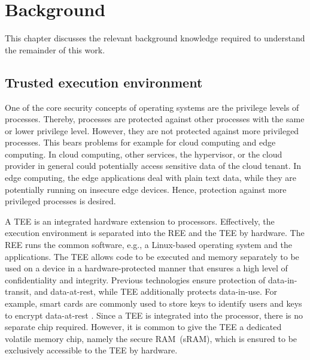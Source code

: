 
\chapter{Background}\label{chapter:background}

This chapter discusses the relevant background knowledge required to understand the remainder of this work.

\section{Trusted execution environment}

One of the core security concepts of operating systems are the privilege levels of processes. Thereby, processes are protected against other processes with the same or lower privilege level. However, they are not protected against more privileged processes. This bears problems for example for cloud computing and edge computing. In cloud computing, other services, the hypervisor, or the cloud provider in general could potentially access sensitive data of the cloud tenant. In edge computing, the edge applications deal with plain text data, while they are potentially running on insecure edge devices. Hence, protection against more privileged processes is desired.


A \ac{TEE} is an integrated hardware extension to processors. Effectively, the execution environment is separated into the \ac{REE} and the \ac{TEE} by hardware. The \ac{REE} runs the common software, e.g., a Linux-based operating system and the applications. The TEE allows code to be executed and memory separately to be used on a device in a hardware-protected manner that ensures a high level of confidentiality and integrity.
Previous technologies ensure protection of data-in-transit, and data-at-rest, while \ac{TEE} additionally protects data-in-use.
For example, smart cards are commonly used to store keys to identify users and keys to encrypt data-at-rest \cite{Arthur2015}.
Since a \ac{TEE} is integrated into the processor, there is no separate chip required. However, it is common to give the \ac{TEE} a dedicated volatile memory chip, namely the secure RAM~(sRAM), which is ensured to be exclusively accessible to the \ac{TEE} by hardware.

